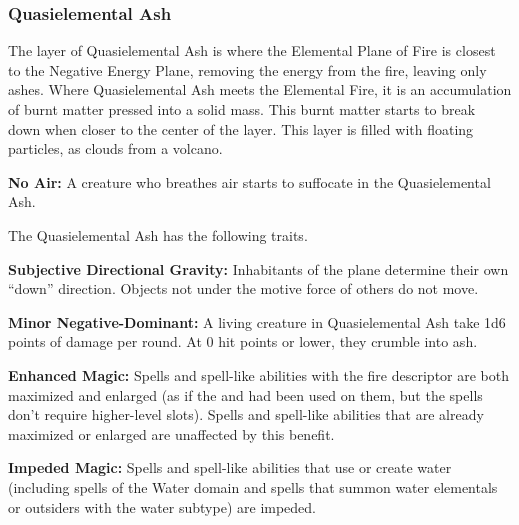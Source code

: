 \subsubsection{Quasielemental Ash}
The layer of Quasielemental Ash is where the Elemental Plane of Fire is closest to the Negative Energy Plane, removing the energy from the fire, leaving only ashes. Where Quasielemental Ash meets the Elemental Fire, it is an accumulation of burnt matter pressed into a solid mass. This burnt matter starts to break down when closer to the center of the layer. This layer is filled with floating particles, as clouds from a volcano.

\textbf{No Air:} A creature who breathes air starts to suffocate in the Quasielemental Ash.

The Quasielemental Ash has the following traits.
\begin{itemize*}
\item \textbf{Subjective Directional Gravity:} Inhabitants of the plane determine their own ``down'' direction. Objects not under the motive force of others do not move.
\item \textbf{Minor Negative-Dominant:} A living creature in Quasielemental Ash take 1d6 points of damage per round. At 0 hit points or lower, they crumble into ash.
\item \textbf{Enhanced Magic:} Spells and spell-like abilities  with the fire descriptor are both maximized and enlarged (as if the  and  had been used on them, but the spells don't require higher-level slots). Spells and spell-like abilities that are already maximized or enlarged are unaffected by this benefit.
\item \textbf{Impeded Magic:} Spells and spell-like abilities that use or create water (including spells of the Water domain and spells that summon water elementals or outsiders with the water subtype) are impeded.
\end{itemize*}
